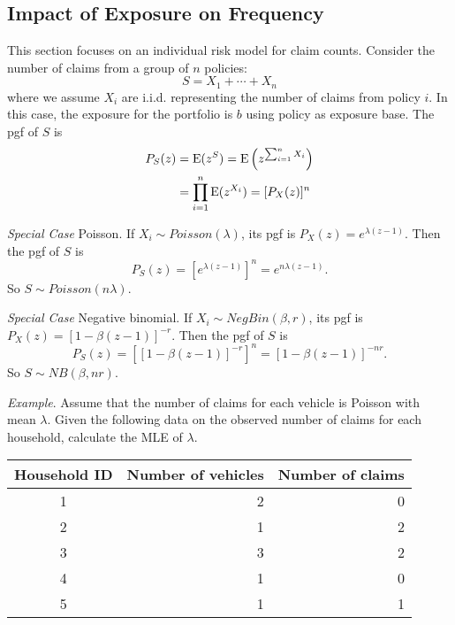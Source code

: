 \documentclass[12pt,letterpaper]{article}
\begin{document}
\subsection{Impact of Exposure on Frequency}

This section focuses on an individual risk model for claim counts. Consider the number of claims from a group of $n$ policies:
$$S=X_1+\cdots+X_n$$
where we assume $X_i$ are i.i.d. representing the number of claims from policy $i$. In this case, the exposure for the portfolio is $b$ using policy as exposure base. The pgf of $S$ is
\begin{align*}
P_S(z)&={\rm E}(z^S)={\rm E}\left(z^{\sum_{i=1}^nX_i}\right)\\
&=\prod_{i=1}^n{\rm E}(z^{X_i})=[P_X(z)]^n
\end{align*}

\textit{Special Case} Poisson. If $X_i\sim Poisson(\lambda)$, its pgf is $P_X(z)=e^{\lambda(z-1)}$. Then the pgf of $S$ is
  $$P_S(z)=[e^{\lambda(z-1)}]^n=e^{n\lambda(z-1)}.$$
So $S\sim Poisson(n\lambda)$.

\bigskip
\textit{Special Case} Negative binomial. If $X_i\sim NegBin(\beta,r)$, its pgf is $P_X(z)=[1-\beta(z-1)]^{-r}$. Then the pgf of $S$ is
  $$P_S(z)=[[1-\beta(z-1)]^{-r}]^n=[1-\beta(z-1)]^{-nr}.$$
So $S\sim NB(\beta,nr)$.



\bigskip

\noindent \textit{Example}. Assume that the number of claims for each vehicle is Poisson with mean $\lambda$. Given the following data on the observed number of claims for each household, calculate the MLE of $\lambda$.

\begin{center}
\begin{tabular}{|c|r|r|}
  \hline
  Household ID & Number of vehicles & Number of claims \\ %
  \hline
  1 & 2 & 0 \\
  2 & 1 & 2 \\
  3 & 3 & 2 \\
  4 & 1 & 0 \\
  5 & 1 & 1 \\
  \hline
\end{tabular}
\end{center}
\end{document}
